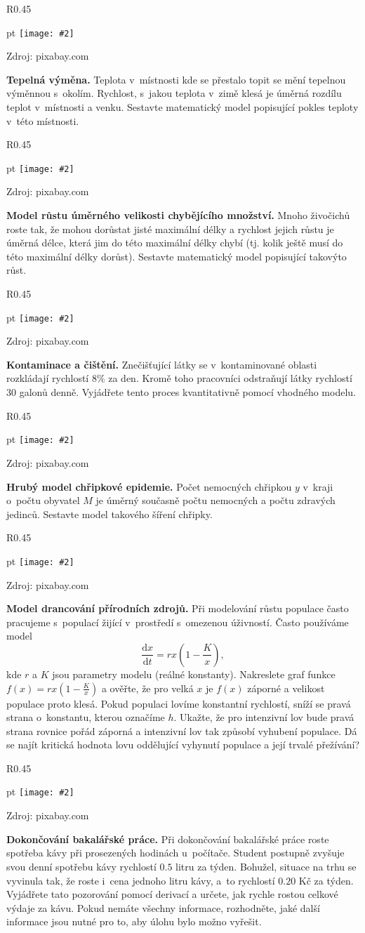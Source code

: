 \documentclass{article}
\newcommand\obrazek[2][pixabay.com]{
  \clearpage
\begin{wrapfigure}{R}{0.45\linewidth}
  \begin{minipage}{1.0\linewidth}\parskip 0 pt
  \texttt{[image: \#2]}

  \vspace*{-10pt}
  \null\hfill{\color{gray}\footnotesize Zdroj: #1}
    
  \end{minipage}
\end{wrapfigure}
}
\let\oldtextbf\textbf
\def\textbf#1{%
  \oldtextbf{\color{red} #1}}
\begin{document}
\obrazek{room.jpg}
\textbf{Tepelná výměna.}  Teplota v místnosti kde se přestalo topit se mění
tepelnou výměnnou s okolím. Rychlost, s jakou teplota v zimě klesá je
úměrná rozdílu teplot v místnosti a venku. Sestavte matematický model
popisující pokles teploty v této místnosti.


\obrazek{mladata.jpg}
\textbf{Model růstu úměrného velikosti chybějícího množství.}  Mnoho
živočichů roste tak, že mohou dorůstat jisté maximální délky a
rychlost jejich růstu je úměrná délce, která jim do této maximální
délky chybí (tj. kolik ještě musí do této maximální délky
dorůst). Sestavte matematický model popisující takovýto růst.


\obrazek{kontaminace.jpg}
\textbf{Kontaminace a čištění.}
Znečišťující látky se v kontaminované oblasti rozkládají rychlostí
$8\%$ za den. Kromě toho pracovníci odstraňují látky rychlostí $30$
galonů denně. Vyjádřete tento proces kvantitativně pomocí vhodného
modelu.

\obrazek{nemoc.jpg}
\textbf{Hrubý model chřipkové epidemie.}  Počet nemocných chřipkou $y$ v kraji o počtu obyvatel $M$ je úměrný současně počtu nemocných a počtu zdravých
jedinců. Sestavte model takového šíření chřipky.


\obrazek{lov.jpg}
\textbf{Model drancování přírodních zdrojů.}
Při modelování růstu populace často pracujeme s populací žijící v prostředí s omezenou úživností. Často používáme model
$$\frac{\mathrm d x}{\mathrm dt}=rx\left(1-\frac Kx\right),$$
kde $r$ a $K$ jsou parametry modelu (reálné konstanty).  Nakreslete
graf funkce $f(x)=rx\left(1-\frac Kx\right)$ a ověřte, že pro velká
$x$ je $f(x)$ záporné a velikost populace proto klesá. Pokud populaci
lovíme konstantní rychlostí, sníží se pravá strana o konstantu, kterou
označíme $h$. Ukažte, že pro intenzivní lov bude pravá strana rovnice
pořád záporná a intenzivní lov tak způsobí vyhubení populace. Dá se
najít kritická hodnota lovu oddělující vyhynutí populace a její
trvalé přežívání?

\obrazek{kafe.jpg}
\textbf{Dokončování bakalářské práce.} Při dokončování bakalářské
práce roste spotřeba kávy při prosezených hodinách u počítače. Student
postupně zvyšuje svou denní spotřebu kávy rychlostí $0.5$ litru za
týden. Bohužel, situace na trhu se vyvinula tak, že roste i cena
jednoho litru kávy, a to rychlostí $0.20$ Kč za týden. Vyjádřete tato
pozorování pomocí derivací a určete, jak rychle rostou celkové výdaje
za kávu. Pokud nemáte všechny informace, rozhodněte, jaké další
informace jsou nutné pro to, aby úlohu bylo možno vyřešit.
\end{document}
